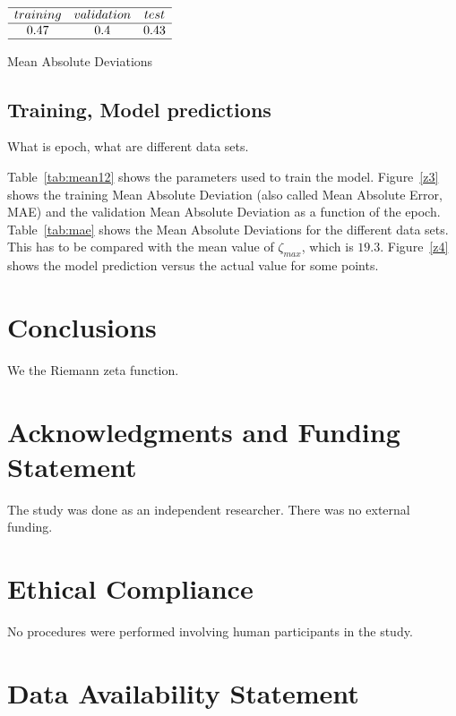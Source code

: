 \documentclass[twoside]{article}
\begin{document}
\begin{table}
\centering \(\begin{array}{cccccccccccc}

\hline
training     &validation  &test \\
\hline
0.47 &0.4  & 0.43  \\
\hline
\end{array}\)
\caption{Mean Absolute Deviations}
\label{tab:mae}
\end{table}

\subsection{\label{relation}Training,  Model predictions}

What is epoch, what are different data sets.

Table~\ref{tab:mean12} shows the parameters used to train the model. 
Figure~\ref{z3} shows the training Mean Absolute Deviation (also called Mean Absolute Error, MAE) 
and the validation Mean Absolute Deviation as a function of the epoch.
Table~\ref{tab:mae} shows the Mean Absolute Deviations for the different data sets.  This has
to be compared with the mean value of $\zeta_{max}$, which is $19.3$.  Figure~\ref{z4}
shows the model prediction versus the actual value for some points.

\section{\label{conclusions}Conclusions}

We the Riemann zeta function.

\section*{Acknowledgments and Funding Statement}

 The study was done as an independent researcher. There was no
external funding.

\section*{Ethical Compliance}

 No procedures were performed  involving human participants in the study.

\section*{Data Availability Statement}
\end{document}
